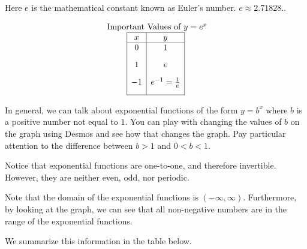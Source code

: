 \documentclass[nooutcomes]{ximera}
\begin{document}
\begin{center}
\end{center}
 
 
Here $e$ is the mathematical constant known as Euler's number.  $e \approx 2.71828 .$.
 
\begin{center}
\end{center}
 
\[
\begin{array}{c}
 \text{ Important Values of } y=e^x \\
\begin{array}{|c|c|}
\hline
 x & y \\
 \hline
 0&1\\[2ex]
 1&e\\[2ex]
 -1&e^{-1}=\frac{1}{e}\\[2ex]
\hline
\end{array}
\end{array}
 \]
 
 
In general, we can talk about exponential functions of the form $y=b^{x}$ where $b$ is a positive number not equal to $1$.  You can play with changing the values of $b$ on the graph using Desmos and see how that changes the graph.  Pay particular attention to the difference between $b>1$ and $0<b<1$.
 
\begin{center} 
\end{center}
 
Notice that exponential functions are one-to-one, and therefore invertible. However, they are neither even, odd, nor periodic.
 
Note that the domain of the exponential functions is $(-\infty, \infty)$. Furthermore, by looking at the graph, we can see that all non-negative numbers are in the range of the exponential functions.
 
We summarize this information in the table below.
 
\end{document}
